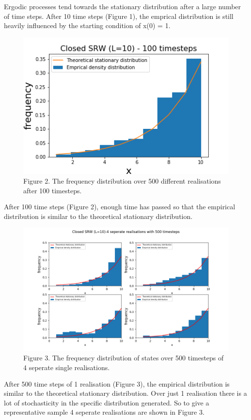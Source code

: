 \documentclass{article}
\begin{document}
Ergodic processes tend towards the stationary distribution after a large number of time steps. After 10 time steps (Figure 1), the emprical distribution is still heavily influenced by the starting condition of x(0) = 1. 

\begin{figure}[H]
\includegraphics[scale=1]{100_steps_a.png} 
\small{Figure 2. The frequency distribution over 500 different realisations after 100 timesteps.}
\end{figure}

After 100 time steps (Figure 2), enough time has passed so that the empirical distribution is similar to the theoretical stationary distribution.


\begin{figure}[H]
\includegraphics[scale=0.5]{500_steps_b.png} 
\small{Figure 3. The frequency distribution of states over 500 timesteps of 4 seperate single realisations. }
\end{figure}

After 500 time steps of 1 realisation (Figure 3), the empirical distribution is similar to the theoretical stationary distribution. Over just 1 realisation there is a lot of stochasticity in the specific distribution generated. So to give a representative sample 4 seperate realisations are shown in Figure 3.
\end{document}
